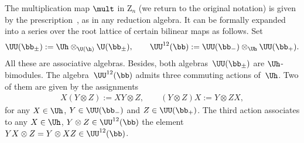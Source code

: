 \documentclass[pdftex]{sigma}
\def\UUb{\UU^{12}(\bb)}\def\V{\mathrm {V}}\def\ve{\varepsilon}\def\Z{\mathrm{Z}}\def\SZ{\mathrm{SZ}}
\numberwithin{equation}{section}
\begin{document}
The multiplication map $\mult$ in $\Z_n$ (we return to the original notation) is given by the
prescription~, as in any reduction algebra. It can be formally expanded into
a series over the root lattice of certain bilinear maps as follows. Set
\begin{gather*}
\UU(\bb_\pm):=\Uh\otimes_{\U(\h)}\U(\bb_\pm)  , \qquad \UUb:=\UU(\bb_-)\otimes_{\Uh}  \UU(\bb_+)  .
\end{gather*}
All these are associative algebras. Besides, both algebras~$\UU(\bb_\pm)$ are $\Uh$-bimodules. The
algebra~$\UUb$ admits three commuting actions of~$\Uh$. Two of them are given by the assignments
\begin{gather*}
X(Y\otimes Z):=XY\otimes Z  ,\qquad (Y\otimes Z)X:=Y\otimes ZX  ,
\end{gather*}
for any $X\in\Uh$, $Y\in\UU(\bb_-)$ and $Z\in\UU(\bb_+)$.
The third action associates to any $X\in\Uh$, $Y\otimes Z\in\UUb$ the element $YX\otimes Z=Y\otimes XZ\in\UUb$.
\end{document}
